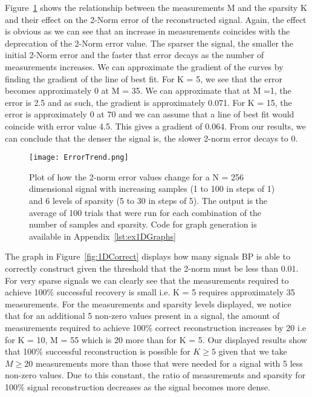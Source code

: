 \documentclass[titlepage,oneside, 12pt]{book}
\theoremstyle{break}
\begin{document}
Figure~\ref{fig:1DError} shows the relationship between the measurements M and the sparsity K and their effect on the 2-Norm error of the reconstructed signal. Again, the effect is obvious as we can see that an increase in measurements coincides with the deprecation of the 2-Norm error value. The sparser the signal, the smaller the initial 2-Norm error and the faster that error decays as the number of measurements increases. We can approximate the gradient of the curves by finding the gradient of the line of best fit. For K = 5, we see that the error becomes approximately 0 at M = 35. We can approximate that at M =1, the error is 2.5 and as such, the gradient is approximately 0.071. For K = 15, the error is approximately 0 at 70 and we can assume that a line of best fit would coincide with error value 4.5. This gives a gradient of 0.064. From our results, we can conclude that the denser the signal is, the slower 2-norm error decays to 0. 


\begin{figure}[H]
\centering
\centerline{\texttt{[image: ErrorTrend.png]}}
\caption{Plot of how the 2-norm error values change for a N = 256 dimensional signal with increasing samples (1 to 100 in steps of 1) and 6 levels of sparsity (5 to 30 in steps of 5). The output is the average of 100 trials that were run for each combination of the number of samples and sparsity. Code for graph generation is available in Appendix~\ref{lst:ex1DGraphs}}
\label{fig:1DError}
\end{figure}

The graph in Figure~\ref{fig:1DCorrect} displays how many signals BP is able to correctly construct given the threshold that the 2-norm must be less than 0.01. For very sparse signals we can clearly see that the measurements required to achieve 100\% successful recovery is small i.e. K = 5 requires approximately 35 measurements. For the measurements and sparsity levels displayed, we notice that for an additional 5 non-zero values present in a signal, the amount of measurements required to achieve 100\% correct reconstruction increases by 20 i.e for K = 10, M = 55 which is 20 more than for K = 5. Our displayed results show that 100\% successful reconstruction is possible for $K \geq 5$ given that we take  $M \geq 20$ measurements more than those that were needed for a signal with 5 less non-zero values. Due to this constant, the ratio of measurements and sparsity for 100\% signal reconstruction decreases as the signal becomes more dense. 
\end{document}
